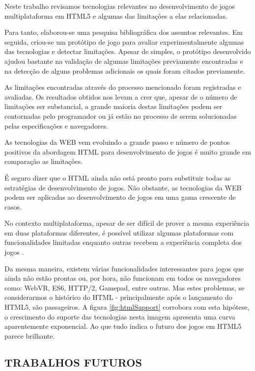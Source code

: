 
Neste trabalho revisamos tecnologias relevantes no desenvolvimento
de jogos multiplataforma em HTML5 e algumas das limitações a elas
relacionadas.

Para tanto, elaborou-se uma pesquisa bibliográfica
dos assuntos relevantes. Em seguida, criou-se um protótipo de jogo
para avaliar experimentalmente algumas das tecnologias e detectar
limitações. Apesar de simples, o protótipo desenvolvido ajudou
bastante na validação de algumas limitações previamente encontradas
e na detecção de alguns problemas adicionais os quais foram citados
previamente.

As limitações encontradas através do processo mencionado foram
registradas e avaliadas. Os resultados obtidos nos levam a crer que,
apesar de o número de limitações ser substancial, a grande maioria
destas limitações podem ser contornadas pelo programador ou já estão
no processo de serem solucionadas pelas especificações e navegadores.

As tecnologias da WEB vem evoluindo a grande passo e número de pontos
positivos da abordagem HTML para desenvolvimento de jogos é muito
grande em comparação as limitações.

É seguro dizer que o HTML ainda não está pronto para substituir todas
as estratégias de desenvolvimento de jogos. Não obstante, as tecnologias
da WEB podem ser aplicadas ao desenvolvimento de jogos em uma gama
crescente de casos.

No contexto multiplataforma, apesar de ser difícil de prover a
mesma experiência em duas plataformas diferentes, é possível
utilizar algumas plataformas com funcionalidades limitadas enquanto
outras recebem a experiência completa dos jogos \autocite[pp.
1]{currentStateCrossPlatform}.

Da mesma maneira, existem várias funcionalidades interessantes para
jogos que ainda não estão prontas ou, por hora, não funcionam
em todos os navegadores como: WebVR, ES6, HTTP/2, Gamepad, entre
outras. Mas estes problemas, se considerarmos o histórico do HTML -
principalmente após o lançamento do HTML5, são passageiros. A figura
\ref{fig:htmlSupport} corrobora com esta hipótese, o crescimento do
suporte das tecnologias nesta imagem apresenta uma curva aparentemente
exponencial. Ao que tudo indica o futuro dos jogos em HTML5 parece
brilhante.

\subsection{TRABALHOS FUTUROS}


